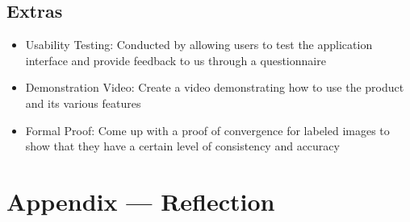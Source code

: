 \documentclass{article}
\begin{document}
\subsection{Extras}
\begin{itemize}
  \item Usability Testing: Conducted by allowing users to test the application interface and provide feedback to us through a questionnaire
  \item Demonstration Video: Create a video demonstrating how to use the product and its various features
  \item Formal Proof: Come up with a proof of convergence for labeled images to show that they have a certain level of consistency and accuracy
\end{itemize}


\newpage{}

\section*{Appendix --- Reflection}



\end{document}
